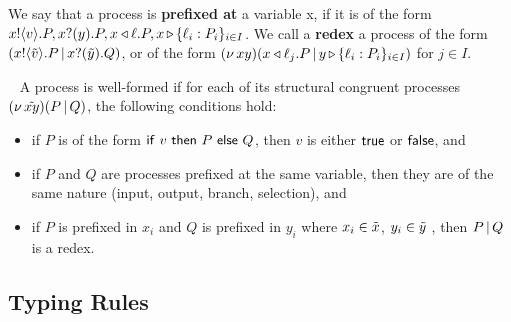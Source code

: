  We say that a process is \textbf{prefixed at} a variable x, if it is of the form $x{}!\langle v\rangle. P, {x}{}?(y). P, x\triangleleft \ell. P, x\,{\triangleright}\,\{\ell_i:P_i\}_{i \in I}$. We call a \textbf{redex} a process of the form $(x{}!\langle \tilde{v}\rangle. P \,|\, {x}{}?(\tilde{y}). Q)$, or of the form $(\nu\,xy)(x\triangleleft \ell_j. P \,|\, y\,{\triangleright}\,\{\ell_i: P_i\}_{i \in I})$ for $j \in I$.

\begin{definition}~\label{lmm:wellformedness}
  A process is well-formed if for each of its structural congruent processes $ (\nu\,\tilde{xy})( P \,|\, Q)$, the following conditions hold:
\begin{itemize}
  \item  if $P$ is of the form $ \If\ v\ \Then\ P\ \Else\ Q$, then $v$ is either $\mathsf{true}$ or $\mathsf{false}$, and
  \item  if $P$ and $Q$ are processes prefixed at the same variable, then they are of the same nature (input, output, branch, selection), and
  \item if $P$ is prefixed in $x_i$ and $Q$ is prefixed in $y_i$ where $x_i \in \tilde{x}$, $y_i \in \tilde{y}$ , then $P \,|\, Q$ is a redex.
\end{itemize}
\end{definition}

\subsection{Typing Rules}

